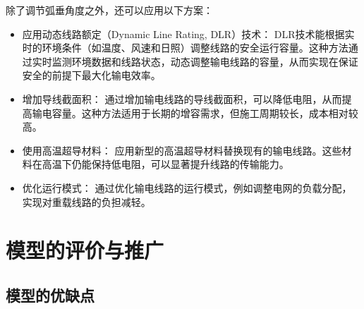 \documentclass[withoutpreface,bwprint]{cumcmthesis}  %
\begin{document}
        除了调节弧垂角度之外，还可以应用以下方案：
        \begin{itemize}
            \item 应用动态线路额定（Dynamic Line Rating, DLR）技术：
                  DLR技术能根据实时的环境条件（如温度、风速和日照）调整线路的安全运行容量。这种方法通过实时监测环境数据和线路状态，动态调整输电线路的容量，从而实现在保证安全的前提下最大化输电效率。
            \item 增加导线截面积：
                  通过增加输电线路的导线截面积，可以降低电阻，从而提高输电容量。这种方法适用于长期的增容需求，但施工周期较长，成本相对较高。
            \item 使用高温超导材料：
                  应用新型的高温超导材料替换现有的输电线路。这些材料在高温下仍能保持低电阻，可以显著提升线路的传输能力。
            \item 优化运行模式：
                  通过优化输电线路的运行模式，例如调整电网的负载分配，实现对重载线路的负担减轻。
        \end{itemize}
    

        \newpage
	\section{模型的评价与推广}
	\subsection{模型的优缺点}
\end{document}
